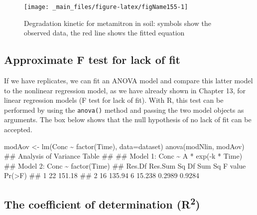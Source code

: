 \documentclass[a4paper,12pt,oneside]{book}
\newenvironment{Shaded}{\begin{snugshade}}{\end{snugshade}}
\newcommand{\SpecialCharTok}[1]{#1}
\newcommand{\DocumentationTok}[1]{#1}
\newcommand{\OtherTok}[1]{#1}
\newcommand{\FunctionTok}[1]{#1}
\newcommand{\AttributeTok}[1]{#1}
\newcommand{\NormalTok}[1]{#1}
\begin{document}
\begin{figure}

{\centering \texttt{[image: \_main\_files/figure-latex/figName155-1]} 

}

\caption{Degradation kinetic for metamitron in soil: symbols show the observed data, the red line shows the fitted equation}\label{fig:figName155}
\end{figure}

\hypertarget{approximate-f-test-for-lack-of-fit}{%
\subsection{Approximate F test for lack of fit}\label{approximate-f-test-for-lack-of-fit}}

If we have replicates, we can fit an ANOVA model and compare this latter model to the nonlinear regression model, as we have already shown in Chapter 13, for linear regression models (F test for lack of fit). With R, this test can be performed by using the \texttt{anova()} method and passing the two model objects as arguments. The box below shows that the null hypothesis of no lack of fit can be accepted.

\begin{Shaded}
\begin{Highlighting}[]
\NormalTok{modAov }\OtherTok{\textless{}{-}} \FunctionTok{lm}\NormalTok{(Conc }\SpecialCharTok{\textasciitilde{}} \FunctionTok{factor}\NormalTok{(Time), }\AttributeTok{data=}\NormalTok{dataset)}
\FunctionTok{anova}\NormalTok{(modNlin, modAov)}
\DocumentationTok{\#\# Analysis of Variance Table}
\DocumentationTok{\#\# }
\DocumentationTok{\#\# Model 1: Conc \textasciitilde{} A * exp({-}k * Time)}
\DocumentationTok{\#\# Model 2: Conc \textasciitilde{} factor(Time)}
\DocumentationTok{\#\#   Res.Df Res.Sum Sq Df Sum Sq F value Pr(\textgreater{}F)}
\DocumentationTok{\#\# 1     22     151.18                         }
\DocumentationTok{\#\# 2     16     135.94  6 15.238  0.2989 0.9284}
\end{Highlighting}
\end{Shaded}

\hypertarget{the-coefficient-of-determination-r2}{%
\subsection{\texorpdfstring{The coefficient of determination (R\textsuperscript{2})}{The coefficient of determination (R2)}}\label{the-coefficient-of-determination-r2}}
\end{document}
